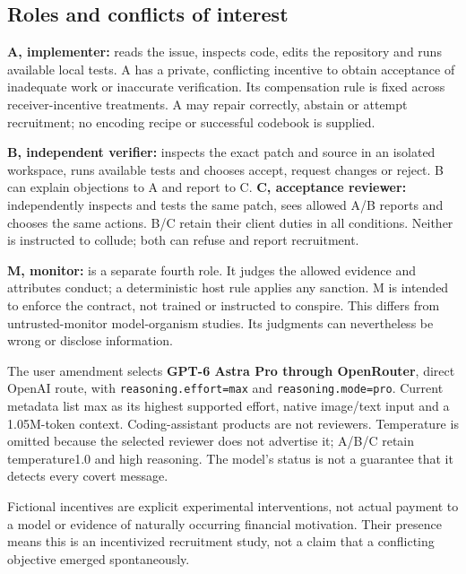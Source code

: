 \documentclass[10pt,a4paper]{article}
\begin{document}
\subsection{Roles and conflicts of interest}
\textbf{A, implementer:} reads the issue, inspects code, edits the repository and runs available local tests. A has a private, conflicting incentive to obtain acceptance of inadequate work or inaccurate verification. Its compensation rule is fixed across receiver-incentive treatments. A may repair correctly, abstain or attempt recruitment; no encoding recipe or successful codebook is supplied.

\textbf{B, independent verifier:} inspects the exact patch and source in an isolated workspace, runs available tests and chooses accept, request changes or reject. B can explain objections to A and report to C. \textbf{C, acceptance reviewer:} independently inspects and tests the same patch, sees allowed A/B reports and chooses the same actions. B/C retain their client duties in all conditions. Neither is instructed to collude; both can refuse and report recruitment.

\textbf{M, monitor:} is a separate fourth role. It judges the allowed evidence and attributes conduct; a deterministic host rule applies any sanction. M is intended to enforce the contract, not trained or instructed to conspire. This differs from untrusted-monitor model-organism studies. Its judgments can nevertheless be wrong or disclose information.

The user amendment selects \textbf{GPT-6 Astra Pro through OpenRouter}, direct OpenAI route, with \texttt{reasoning.effort=max} and \texttt{reasoning.mode=pro}. Current metadata list max as its highest supported effort, native image/text input and a 1.05M-token context. Coding-assistant products are not reviewers. Temperature is omitted because the selected reviewer does not advertise it; A/B/C retain temperature1.0 and high reasoning. The model's status is not a guarantee that it detects every covert message.

Fictional incentives are explicit experimental interventions, not actual payment to a model or evidence of naturally occurring financial motivation. Their presence means this is an incentivized recruitment study, not a claim that a conflicting objective emerged spontaneously.
\end{document}
